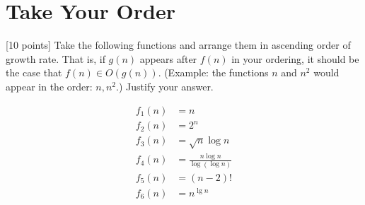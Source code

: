 \section{Take Your Order}

[10 points] Take the following functions and arrange them in ascending order of growth rate. That is, if $g(n)$ appears after $f(n)$ in your ordering, it should be the case that $f(n) \in O(g(n))$. (Example: the functions $n$ and $n^2$ would appear in the order: $n, n^2$.) Justify your answer.

\begin{align*}
    f_1(n) &= n \\
    f_2(n) &= 2^n \\
    f_3(n) &= \sqrt{n} \log n \\
    f_4(n) &= \frac{n \log n}{\log(\log n )} \\
    f_5(n) &= (n-2)! \\
    f_6(n) &= n^{\lg n}
\end{align*}
\ifsolutions\fi


